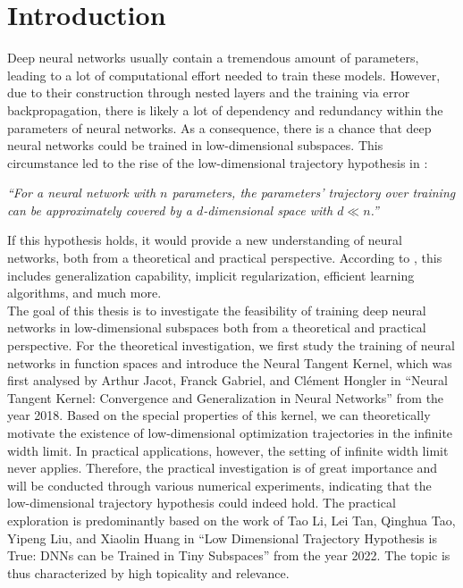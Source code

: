 \documentclass[11pt, a4paper]{article}
\begin{document}
\tableofcontents
\thispagestyle{empty}

\pagebreak
\section{Introduction}

Deep neural networks usually contain a tremendous amount of parameters, leading to a lot of computational effort needed to train these models. However, due to their construction through nested layers and the training via error backpropagation, there is likely a lot of dependency and redundancy within the parameters of neural networks. As a consequence, there is a chance that deep neural networks could be trained in low-dimensional subspaces. This circumstance led to the rise of the low-dimensional trajectory hypothesis in \cite{Paper}:

\begin{center}
\textit{``For a neural network with $n$ parameters, the parameters’ trajectory over training \\can be approximately covered by a $d$-dimensional space with $d \ll n$.''}
\end{center}

If this hypothesis holds, it would provide a new understanding of neural networks, both from a theoretical and practical perspective. According to \cite{Paper}, this includes generalization capability, implicit regularization, efficient learning algorithms, and much more. \\

The goal of this thesis is to investigate the feasibility of training deep neural networks in low-dimensional subspaces both from a theoretical and practical perspective. For the theoretical investigation, we first study the training of neural networks in function spaces and introduce the Neural Tangent Kernel, which was first analysed by Arthur Jacot, Franck Gabriel, and Cl\'{e}ment Hongler in ``Neural Tangent Kernel: Convergence and Generalization in Neural Networks'' \cite{NTK} from the year 2018. Based on the special properties of this kernel, we can theoretically motivate the existence of low-dimensional optimization trajectories in the infinite width limit. In practical applications, however, the setting of infinite width limit never applies. Therefore, the practical investigation is of great importance and will be conducted through various numerical experiments, indicating that the low-dimensional trajectory hypothesis could indeed hold. The practical exploration is predominantly based on the work of Tao Li, Lei Tan, Qinghua Tao, Yipeng Liu, and Xiaolin Huang in ``Low Dimensional Trajectory Hypothesis is True: DNNs can be Trained in Tiny Subspaces'' \cite{Paper} from the year 2022. The topic is thus characterized by high topicality and relevance. \\
\end{document}

